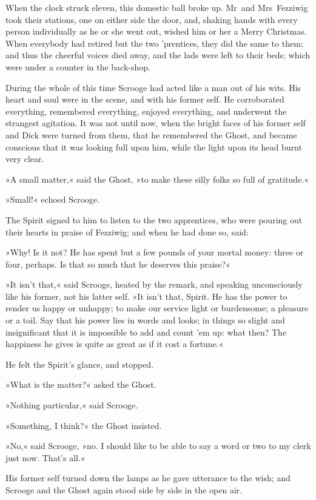 When the clock struck eleven, this domestic ball broke up. Mr~and Mrs~Fezziwig took their stations, one on either side the door, and, shaking hands with every person individually as he or she went out, wished him or her a Merry Christmas. When everybody had retired but the two 'prentices, they did the same to them; and thus the cheerful voices died away, and the lads were left to their beds; which were under a counter in the back-shop.

During the whole of this time Scrooge had acted like a man out of his wits. His heart and soul were in the scene, and with his former self. He corroborated everything, remembered everything, enjoyed everything, and underwent the strangest agitation. It was not until now, when the bright faces of his former self and Dick were turned from them, that he remembered the Ghost, and became conscious that it was looking full upon him, while the light upon its head burnt very clear.

»A small matter,« said the Ghost, »to make these silly folks so full of gratitude.«

»Small!« echoed Scrooge.

The Spirit signed to him to listen to the two apprentices, who were pouring out their hearts in praise of Fezziwig; and when he had done so, said:

»Why! Is it not? He has spent but a few pounds of your mortal money: three or four, perhaps. Is that so much that he deserves this praise?«

»It isn't that,« said Scrooge, heated by the remark, and speaking unconsciously like his former, not his latter self. »It isn't that, Spirit. He has the power to render us happy or unhappy; to make our service light or burdensome; a pleasure or a toil. Say that his power lies in words and looks; in things so slight and insignificant that it is impossible to add and count 'em up: what then? The happiness he gives is quite as great as if it cost a fortune.«

He felt the Spirit's glance, and stopped.

»What is the matter?« asked the Ghost.

»Nothing particular,« said Scrooge.

»Something, I think?« the Ghost insisted.

»No,« said Scrooge, »no. I should like to be able to say a word or two to my clerk just now. That's all.«

His former self turned down the lamps as he gave utterance to the wish; and Scrooge and the Ghost again stood side by side in the open air.

